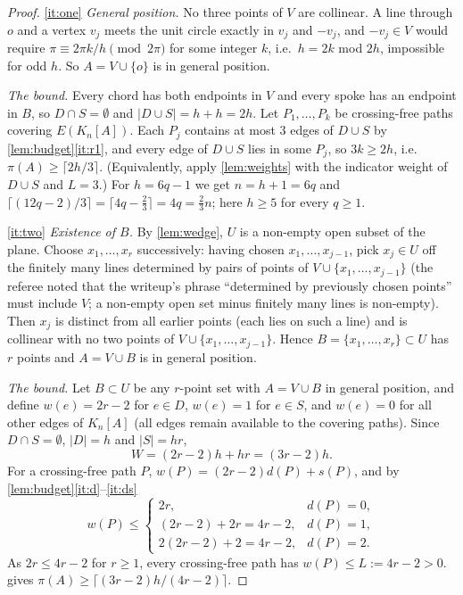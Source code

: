 \documentclass[11pt,a4paper]{article}
\theoremstyle{plain}
\theoremstyle{definition}
\theoremstyle{remark}
\newcommand{\pipath}{\pi}
\newcommand{\dP}{d}
\newcommand{\sP}{s}
\begin{document}
\label{pf:main}
\thmmain*
\begin{proof}
\ref{it:one} \emph{General position.} No three points of $V$ are collinear. A line through $o$ and a vertex $v_j$ meets the unit circle exactly in $v_j$ and $-v_j$, and $-v_j\in V$ would require $\pi\equiv2\pi k/h\pmod{2\pi}$ for some integer $k$, i.e.\ $h=2k$ mod $2h$, impossible for odd $h$. So $A=V\cup\{o\}$ is in general position.

\emph{The bound.} Every chord has both endpoints in $V$ and every spoke has an endpoint in $B$, so $D\cap S=\emptyset$ and $|D\cup S|=h+h=2h$. Let $P_1,\dots,P_k$ be crossing-free paths covering $E(K_n[A])$. Each $P_j$ contains at most $3$ edges of $D\cup S$ by \cref{lem:budget}\ref{it:r1}, and every edge of $D\cup S$ lies in some $P_j$, so $3k\ge2h$, i.e.\ $\pipath(A)\ge\lceil2h/3\rceil$. (Equivalently, apply \cref{lem:weights} with the indicator weight of $D\cup S$ and $L=3$.) For $h=6q-1$ we get $n=h+1=6q$ and $\lceil(12q-2)/3\rceil=\lceil4q-\tfrac23\rceil=4q=\tfrac23n$; here $h\ge5$ for every $q\ge1$.

\ref{it:two} \emph{Existence of $B$.} By \cref{lem:wedge}, $U$ is a non-empty open subset of the plane. Choose $x_1,\dots,x_r$ successively: having chosen $x_1,\dots,x_{j-1}$, pick $x_j\in U$ off the finitely many lines determined by pairs of points of $V\cup\{x_1,\dots,x_{j-1}\}$ (the referee noted that the writeup's phrase ``determined by previously chosen points'' must include $V$; a non-empty open set minus finitely many lines is non-empty). Then $x_j$ is distinct from all earlier points (each lies on such a line) and is collinear with no two points of $V\cup\{x_1,\dots,x_{j-1}\}$. Hence $B=\{x_1,\dots,x_r\}\subset U$ has $r$ points and $A=V\cup B$ is in general position.

\emph{The bound.} Let $B\subset U$ be any $r$-point set with $A=V\cup B$ in general position, and define $w(e)=2r-2$ for $e\in D$, $w(e)=1$ for $e\in S$, and $w(e)=0$ for all other edges of $K_n[A]$ (all edges remain available to the covering paths). Since $D\cap S=\emptyset$, $|D|=h$ and $|S|=hr$,
\[
 W=(2r-2)h+hr=(3r-2)h .
\]
For a crossing-free path $P$, $w(P)=(2r-2)\dP(P)+\sP(P)$, and by \cref{lem:budget}\ref{it:d}--\ref{it:ds}
\[
 w(P)\le\begin{cases}
 2r, & \dP(P)=0,\\
 (2r-2)+2r=4r-2, & \dP(P)=1,\\
 2(2r-2)+2=4r-2, & \dP(P)=2.
 \end{cases}
\]
As $2r\le4r-2$ for $r\ge1$, every crossing-free path has $w(P)\le L:=4r-2>0$.  gives $\pipath(A)\ge\lceil(3r-2)h/(4r-2)\rceil$.


\end{proof}
\end{document}
